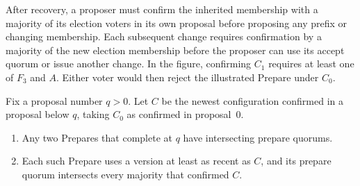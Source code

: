 \documentclass[sigconf,nonacm]{acmart}
\begin{document}
After recovery, a proposer must confirm the inherited membership with a
majority of its election voters in its own proposal before proposing any
prefix or changing membership. Each subsequent change requires
confirmation by a majority of the new election membership before the
proposer can use its accept quorum or issue another change. In the
figure, confirming \(C_1\) requires at least one of \(F_3\) and \(A\).
Either voter would then reject the illustrated Prepare under \(C_0\).

\begin{lemma}\label{lem:prepare}
Fix a proposal number \(q>0\). Let \(C\) be the newest configuration
confirmed in a proposal below \(q\), taking \(C_0\) as confirmed in proposal~0.
\begin{enumerate}
  \item[\emph{(a)}] Any two Prepares that complete at \(q\) have
    intersecting prepare quorums.
  \item[\emph{(b)}] Each such Prepare uses a version at least as recent
    as \(C\), and its prepare quorum intersects every majority that confirmed \(C\).
\end{enumerate}
\end{lemma}
\end{document}
